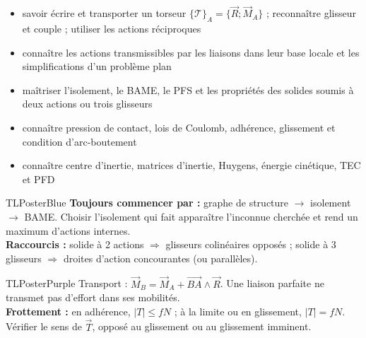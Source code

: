 \documentclass[10pt,a3paper]{article}
\begin{document}
\vspace{2mm}
\begin{minipage}[t]{0.61\linewidth}
\begin{TLPosterSavoirs}
\begin{itemize}
  \item savoir écrire et transporter un torseur $\{\mathcal T\}_A=\{\vec R;\vec M_A\}$ ; reconnaître glisseur et couple ; utiliser les actions réciproques
  \item connaître les actions transmissibles par les liaisons dans leur base locale et les simplifications d'un problème plan
  \item maîtriser l'isolement, le BAME, le PFS et les propriétés des solides soumis à deux actions ou trois glisseurs
  \item connaître pression de contact, lois de Coulomb, adhérence, glissement et condition d'arc-boutement
  \item connaître centre d'inertie, matrices d'inertie, Huygens, énergie cinétique, TEC et PFD
\end{itemize}
\end{TLPosterSavoirs}
\end{minipage}\hfill
\begin{minipage}[t]{0.36\linewidth}
\end{minipage}
\vfill
\begin{minipage}[t]{0.49\linewidth}
\begin{TLPosterBloc}{TLPosterBlue}
\textbf{Toujours commencer par :} graphe de structure $\rightarrow$ isolement $\rightarrow$ BAME. Choisir l'isolement qui fait apparaître l'inconnue cherchée et rend un maximum d'actions internes.\\
\textbf{Raccourcis :} solide à 2 actions $\Rightarrow$ glisseurs colinéaires opposés ; solide à 3 glisseurs $\Rightarrow$ droites d'action concourantes (ou parallèles).
\end{TLPosterBloc}
\begin{TLPosterBloc}{TLPosterPurple}
Transport : $\vec M_B=\vec M_A+\overrightarrow{BA}\wedge\vec R$. Une liaison parfaite ne transmet pas d'effort dans ses mobilités.\\
\textbf{Frottement :} en adhérence, $|T|\le fN$ ; à la limite ou en glissement, $|T|=fN$. Vérifier le sens de $\vec T$, opposé au glissement ou au glissement imminent.
\end{TLPosterBloc}
\end{minipage}\hfill
\end{document}
